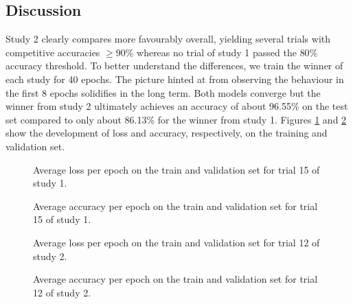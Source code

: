 \documentclass[british,12p]{article}
\begin{document}
	\subsection{Discussion}
    Study 2 clearly compares more favourably overall, yielding several trials with competitive accuracies $\ge 90\%$ whereas no trial of study 1 passed the $80\%$ accuracy threshold. To better understand the differences, we train the winner of each study for 40 epochs. The picture hinted at from observing the behaviour in the first 8 epochs solidifies in the long term. Both models converge but the winner from study 2 ultimately achieves an accuracy of about 96.55\% on the test set compared to only about 86.13\% for the winner from study 1. Figures \ref{fig-trial-1-15-loss} and \ref{fig-trial-1-15-acc} show the development of loss and accuracy, respectively, on the training and validation set. 
    \begin{figure}[h!]
    	\begin{center}
  			\caption{Average loss per epoch on the train and validation set for trial 15 of study 1.}
  			\label{fig-trial-1-15-loss}
  		\end{center}
	\end{figure}
	\begin{figure}[h!]
		\begin{center}
  			\caption{Average accuracy per epoch on the train and validation set for trial 15 of study 1.}
  			\label{fig-trial-1-15-acc}
  		\end{center}
	\end{figure}
	
	\begin{figure}[h!]
    	\begin{center}
  			\caption{Average loss per epoch on the train and validation set for trial 12 of study 2.}
  			\label{fig-trial-2-12-loss}
  		\end{center}
	\end{figure}
	\begin{figure}[h!]
		\begin{center}
  			\caption{Average accuracy per epoch on the train and validation set for trial 12 of study 2.}
  			\label{fig-trial-2-12-acc}
  		\end{center}
	\end{figure}
\end{document}
